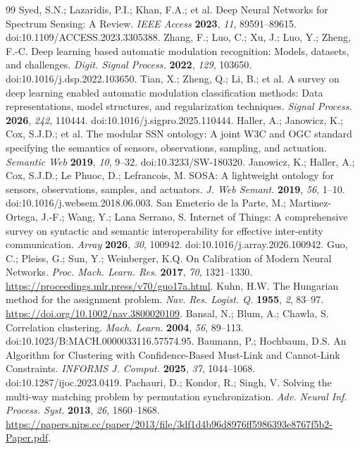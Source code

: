 \begin{thebibliography}{99}
\fontsize{9}{10}\selectfont
{} Syed, S.N.; Lazaridis, P.I.; Khan, F.A.; et al. Deep Neural Networks for Spectrum Sensing: A Review. \emph{IEEE Access} \textbf{2023}, \emph{11}, 89591--89615. doi:10.1109/ACCESS.2023.3305388.
 Zhang, F.; Luo, C.; Xu, J.; Luo, Y.; Zheng, F.-C. Deep learning based automatic modulation recognition: Models, datasets, and challenges. \emph{Digit. Signal Process.} \textbf{2022}, \emph{129}, 103650. doi:10.1016/j.dsp.2022.103650.
 Tian, X.; Zheng, Q.; Li, B.; et al. A survey on deep learning enabled automatic modulation classification methods: Data representations, model structures, and regularization techniques. \emph{Signal Process.} \textbf{2026}, \emph{242}, 110444. doi:10.1016/j.sigpro.2025.110444.
 Haller, A.; Janowicz, K.; Cox, S.J.D.; et al. The modular SSN ontology: A joint W3C and OGC standard specifying the semantics of sensors, observations, sampling, and actuation. \emph{Semantic Web} \textbf{2019}, \emph{10}, 9--32. doi:10.3233/SW-180320.
 Janowicz, K.; Haller, A.; Cox, S.J.D.; Le Phuoc, D.; Lefrancois, M. SOSA: A lightweight ontology for sensors, observations, samples, and actuators. \emph{J. Web Semant.} \textbf{2019}, \emph{56}, 1--10. doi:10.1016/j.websem.2018.06.003.
 San Emeterio de la Parte, M.; Martinez-Ortega, J.-F.; Wang, Y.; Lana Serrano, S. Internet of Things: A comprehensive survey on syntactic and semantic interoperability for effective inter-entity communication. \emph{Array} \textbf{2026}, \emph{30}, 100942. doi:10.1016/j.array.2026.100942.
 Guo, C.; Pleiss, G.; Sun, Y.; Weinberger, K.Q. On Calibration of Modern Neural Networks. \emph{Proc. Mach. Learn. Res.} \textbf{2017}, \emph{70}, 1321--1330. \url{https://proceedings.mlr.press/v70/guo17a.html}.
 Kuhn, H.W. The Hungarian method for the assignment problem. \emph{Nav. Res. Logist. Q.} \textbf{1955}, \emph{2}, 83--97. \url{https://doi.org/10.1002/nav.3800020109}.
 Bansal, N.; Blum, A.; Chawla, S. Correlation clustering. \emph{Mach. Learn.} \textbf{2004}, \emph{56}, 89--113. doi:10.1023/B:MACH.0000033116.57574.95.
 Baumann, P.; Hochbaum, D.S. An Algorithm for Clustering with Confidence-Based Must-Link and Cannot-Link Constraints. \emph{INFORMS J. Comput.} \textbf{2025}, \emph{37}, 1044--1068. doi:10.1287/ijoc.2023.0419.
 Pachauri, D.; Kondor, R.; Singh, V. Solving the multi-way matching problem by permutation synchronization. \emph{Adv. Neural Inf. Process. Syst.} \textbf{2013}, \emph{26}, 1860--1868. \url{https://papers.nips.cc/paper/2013/file/3df1d4b96d8976ff5986393e8767f5b2-Paper.pdf}.

\end{thebibliography}
